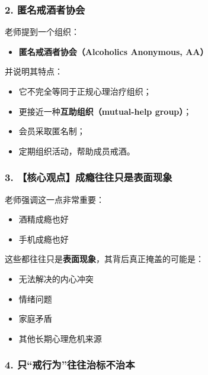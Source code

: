 \documentclass[
  chinese,
  9pt,
  a4paper,
]{ctexart}
\providecommand{\tightlist}{%
  \setlength{\itemsep}{0pt}\setlength{\parskip}{0pt}}
\begin{document}
\subsubsection{2.
匿名戒酒者协会}\label{ux533fux540dux6212ux9152ux8005ux534fux4f1a}

老师提到一个组织：

\begin{itemize}
\tightlist
\item
  \textbf{匿名戒酒者协会（Alcoholics Anonymous, AA）}
\end{itemize}

并说明其特点：

\begin{itemize}
\tightlist
\item
  它不完全等同于正规心理治疗组织；
\item
  更接近一种\textbf{互助组织（mutual-help group）}；
\item
  会员采取匿名制；
\item
  定期组织活动，帮助成员戒酒。
\end{itemize}

\subsubsection{3.
【核心观点】成瘾往往只是表面现象}\label{ux6838ux5fc3ux89c2ux70b9ux6210ux763eux5f80ux5f80ux53eaux662fux8868ux9762ux73b0ux8c61}

老师强调这一点非常重要：

\begin{itemize}
\tightlist
\item
  酒精成瘾也好
\item
  手机成瘾也好
\end{itemize}

这些都往往只是\textbf{表面现象}，其背后真正掩盖的可能是：

\begin{itemize}
\tightlist
\item
  无法解决的内心冲突
\item
  情绪问题
\item
  家庭矛盾
\item
  其他长期心理危机来源
\end{itemize}

\subsubsection{4.
只``戒行为''往往治标不治本}\label{ux53eaux6212ux884cux4e3aux5f80ux5f80ux6cbbux6807ux4e0dux6cbbux672c}
\end{document}

